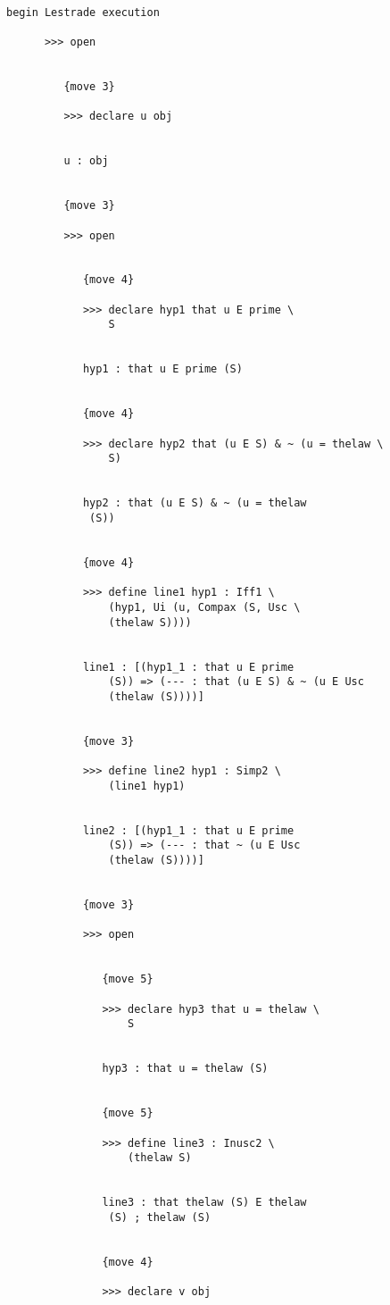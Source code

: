 \documentclass[12pt]{article}
\begin{document}
\begin{verbatim}

begin Lestrade execution

      >>> open


         {move 3}

         >>> declare u obj


         u : obj


         {move 3}

         >>> open


            {move 4}

            >>> declare hyp1 that u E prime \
                S


            hyp1 : that u E prime (S)


            {move 4}

            >>> declare hyp2 that (u E S) & ~ (u = thelaw \
                S)


            hyp2 : that (u E S) & ~ (u = thelaw 
             (S))


            {move 4}

            >>> define line1 hyp1 : Iff1 \
                (hyp1, Ui (u, Compax (S, Usc \
                (thelaw S))))


            line1 : [(hyp1_1 : that u E prime 
                (S)) => (--- : that (u E S) & ~ (u E Usc 
                (thelaw (S))))]


            {move 3}

            >>> define line2 hyp1 : Simp2 \
                (line1 hyp1)


            line2 : [(hyp1_1 : that u E prime 
                (S)) => (--- : that ~ (u E Usc 
                (thelaw (S))))]


            {move 3}

            >>> open


               {move 5}

               >>> declare hyp3 that u = thelaw \
                   S


               hyp3 : that u = thelaw (S)


               {move 5}

               >>> define line3 : Inusc2 \
                   (thelaw S)


               line3 : that thelaw (S) E thelaw 
                (S) ; thelaw (S)


               {move 4}

               >>> declare v obj



\end{verbatim}
\end{document}
